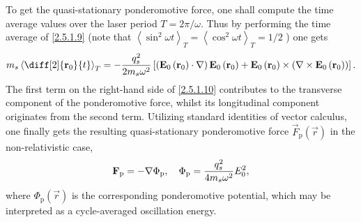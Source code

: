 To get the quasi-stationary ponderomotive force, one shall compute the time average values over the laser period $ T = 2 \pi/ \omega $. Thus by performing the time average of \ref{2.5.1.9} (note that $ \left\langle \sin^2 \omega t \right\rangle_T = \left\langle \cos^2 \omega t \right\rangle_T = 1/2$ ) one gets
\begin{equation}
\label{2.5.1.10}
m_s \left\langle \diff[2]{\vec{r}_0}{t} \right\rangle_{T} = - \frac{q_s^{2}}{2 m_s \omega^2} \left[\left(\vec{E}_0 \left(\vec{r}_0 \right) \cdot \nabla \right) \vec{E}_0 \left(\vec{r}_0 \right) + \vec{E}_0 \left(\vec{r}_0 \right) \times \left( \nabla \times \vec{E}_0 \left(\vec{r}_0 \right) \right)\right].
\end{equation}
The first term on the right-hand side of \ref{2.5.1.10} contributes to the transverse component of the ponderomotive force, whilst its longitudinal component originates from the second term. Utilizing standard identities of vector calculus, one finally gets the resulting quasi-stationary ponderomotive force $ \vec{F}_{\mathrm{p}} \left( \vec{r} \right) $ in the non-relativistic case,
\begin{equation}
\label{2.5.1.11}
\mathbf{F}_{\mathrm{p}} = - \nabla \Phi_{\mathrm{p}}, \quad \Phi_{\mathrm{p}} = \frac{q_s^{2}}{4 m_s \omega^2} E_0^{2},
\end{equation}
where $ \Phi_{\mathrm{p}} \left( \vec{r} \right) $ is the corresponding ponderomotive potential, which may be interpreted as a cycle-averaged oscillation energy.


